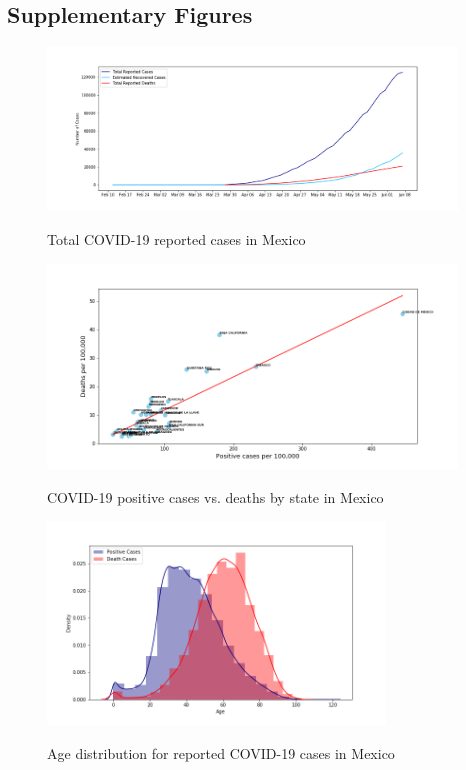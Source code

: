 \documentclass[hidelinks,10pt]{article}
\begin{document}
	\subsection{Supplementary Figures}\label{sec_app}
	\setcounter{figure}{0} 
		\begin{figure}[ht!]
		\caption{Total COVID-19 reported cases in Mexico}
		\centering 
		\includegraphics[width=0.97\textwidth]{Total_Cases}
		\label{fig:1}
	\end{figure}
\begin{figure}[ht!]
	\caption{COVID-19 positive cases vs. deaths by state in Mexico}
	\centering 
	\includegraphics[width=0.97\textwidth]{CasesVSdeaths}
	\label{fig:2}
\end{figure} 
\begin{figure}[ht!]
	\caption{Age distribution for reported COVID-19 cases in Mexico}
	\centering 
	\includegraphics[width=0.8\textwidth]{Age_distribution}
	\label{fig:3}
\end{figure} 
\end{document}
